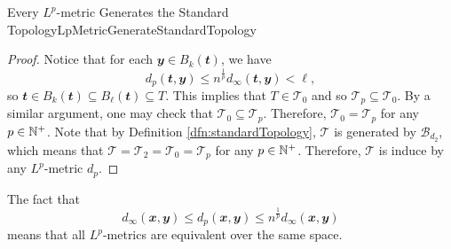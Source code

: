 \documentclass[math]{amznotes}
\theoremstyle{remark}
\begin{document}
\begin{probox}{Every $L^p$-metric Generates the Standard Topology}{LpMetricGenerateStandardTopology}
\begin{proof}
        Notice that for each $\mathbfit{y} \in B_{k}\left(\mathbfit{t}\right)$, we have 
        \begin{equation*}
            d_p\left(\mathbfit{t}, \mathbfit{y}\right) \leq n^{\frac{1}{p}}d_{\infty}\left(\mathbfit{t}, \mathbfit{y}\right) < \ell,
        \end{equation*}
        so $\mathbfit{t} \in B_{k}\left(\mathbfit{t}\right) \subseteq B_{\ell}\left(\mathbfit{t}\right) \subseteq T$. This implies that $T \in \mathcal{T}_0$ and so $\mathcal{T}_p \subseteq \mathcal{T}_0$. By a similar argument, one may check that $\mathcal{T}_0 \subseteq \mathcal{T}_p$. Therefore, $\mathcal{T}_0 = \mathcal{T}_p$ for any $p \in \mathbb{N}^+$. Note that by Definition \ref{dfn:standardTopology}, $\mathcal{T}$ is generated by $\mathcal{B}_{d_2}$, which means that $\mathcal{T} = \mathcal{T}_2 = \mathcal{T}_0 = \mathcal{T}_p$ for any $p \in \mathbb{N}^+$. Therefore, $\mathcal{T}$ is induce by any $L^p$-metric $d_p$.
    \end{proof}
\end{probox}
The fact that
\begin{equation*}
    d_{\infty}\left(\mathbfit{x}, \mathbfit{y}\right) \leq d_p\left(\mathbfit{x}, \mathbfit{y}\right) \leq n^{\frac{1}{p}}d_{\infty}\left(\mathbfit{x}, \mathbfit{y}\right)
\end{equation*}
means that all $L^p$-metrics are equivalent over the same space.
\end{document}

